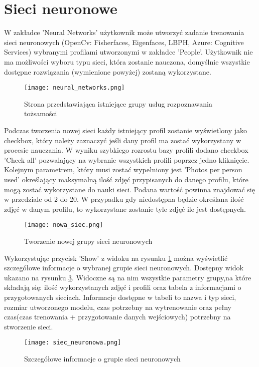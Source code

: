 \section{Sieci neuronowe}
W zakładce 'Neural Networks' użytkownik może utworzyć zadanie trenowania sieci neuronowych (OpenCv: Fisherfaces, Eigenfaces, LBPH, Azure: Cognitive Services) wybranymi profilami utworzonymi w zakładce 'People'. Użytkownik nie ma możliwości wyboru typu sieci, która zostanie nauczona, domyślnie wszystkie dostępne rozwiązania (wymienione powyżej) zostaną wykorzystane.
\begin{figure}[H]
	\centering
	\texttt{[image: neural\_networks.png]}
	\caption{Strona przedstawiająca istniejące grupy usług rozpoznawania tożsamości}
	\label{fig:sieci_neuronowe}
\end{figure}
Podczas tworzenia nowej sieci każdy istniejący profil zostanie wyświetlony jako checkbox, który należy zaznaczyć jeśli dany profil ma zostać wykorzystany w procesie nauczania. W wyniku szybkiego rozrostu bazy profili dodano checkbox 'Check all' pozwalający na wybranie wszystkich profili poprzez jedno kliknięcie. Kolejnym parametrem, który musi zostać wypełniony jest 'Photos per person used' określający maksymalną ilość zdjęć przypisanych do danego profilu, które mogą zostać wykorzystane do nauki sieci. Podana wartość powinna znajdować się w przedziale od 2 do 20. W przypadku gdy niedostępna będzie określana ilość zdjęć w danym profilu, to wykorzystane zostanie tyle zdjęć ile jest dostępnych.
\begin{figure}[H]
	\centering
	\texttt{[image: nowa\_siec.png]}
	\caption{Tworzenie nowej grupy sieci neuronowych}
	\label{fig:nowa_siec}
\end{figure}
Wykorzystując przycisk 'Show' z widoku na rysunku \ref{fig:sieci_neuronowe} można wyświetlić szczegółowe informacje o wybranej grupie sieci neuronowych. Dostępny widok ukazano na rysunku \ref{fig:siec_neuronowa}. Widoczne są na nim wszystkie parametry grupy,na które składają się: ilość wykorzystanych zdjęć i profili oraz tabela z informacjami o przygotowanych sieciach. Informacje dostępne w tabeli to nazwa i typ sieci, rozmiar utworzonego modelu, czas potrzebny na wytrenowanie oraz pełny czas(czas trenowania + przygotowanie danych wejściowych) potrzebny na stworzenie sieci.
\begin{figure}[H]
	\centering
	\texttt{[image: siec\_neuronowa.png]}
	\caption{Szczegółowe informacje o grupie sieci neuronowych}
	\label{fig:siec_neuronowa}
\end{figure}

